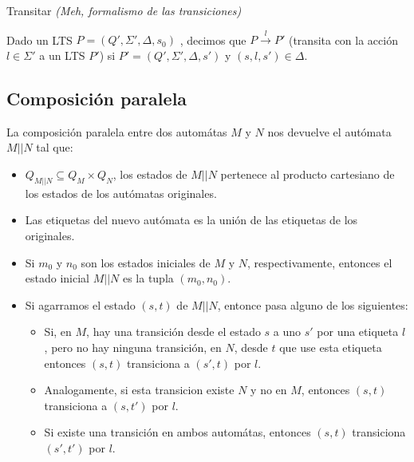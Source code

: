 \begin{definicion}{Transitar}
\textit{(Meh, formalismo de las transiciones)}

Dado un LTS $P = (Q', \Sigma', \Delta, s_0)$ , decimos que $P \overset{l}{\rightarrow} P'$ (transita con la acción $l\in\Sigma'$ a un LTS $P'$) si $P' = (Q', \Sigma', \Delta, s')$ y  $(s,l,s') \in \Delta$.
\end{definicion}

\subsection{Composición paralela}
La composición paralela entre dos automátas $M$ y $N$ nos devuelve el autómata $M || N$ tal que:
\begin{itemize}
\item $Q_{M||N} \subseteq Q_M \times Q_N$, los estados de $M || N$ pertenece al producto cartesiano de los estados de los autómatas originales.
\item Las etiquetas del nuevo autómata es la unión de las etiquetas de los originales.
\item Si $m_0$ y $n_0$ son los estados iniciales de $M$ y $N$, respectivamente, entonces el estado inicial $M || N$ es la tupla $(m_0, n_0)$.
\item Si agarramos el estado $(s,t)$ de $M||N$, entonce pasa alguno de los siguientes:
\begin{itemize}
\item Si, en $M$, hay una transición desde el estado $s$ a uno $s'$ por una etiqueta $l$, pero no hay ninguna transición, en $N$, desde $t$ que use esta etiqueta entonces $(s, t)$ transiciona a $(s', t)$ por $l$.
\item Analogamente, si esta transicion existe $N$ y no en $M$, entonces $(s,t)$ transiciona a $(s,t')$ por $l$.
\item Si existe una transición en ambos automátas, entonces $(s,t)$ transiciona $(s', t')$ por $l$.
\end{itemize}
\end{itemize} 
